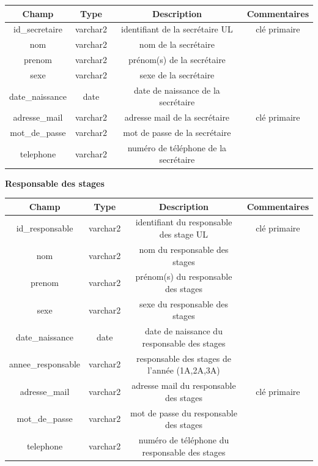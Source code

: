 \documentclass{scrreprt}
\begin{document}
\begin{center}
\begin{tabular}{|c|c|c|c|}
  \hline
  \textbf {Champ} & \textbf {Type} & \textbf {Description} & \textbf {Commentaires} \\
  \hline
  id_secretaire & varchar2 & identifiant de la secrétaire UL & clé primaire\\
  \hline
  nom & varchar2 & nom de la secrétaire & \\
  \hline
  prenom & varchar2 & prénom(s) de la secrétaire &  \\
  \hline
  sexe & varchar2 & sexe de la secrétaire &  \\
  \hline
  date_naissance & date & date de naissance de la secrétaire &  \\
  \hline
  adresse_mail & varchar2 & adresse mail de la secrétaire & clé primaire  \\
  \hline
  mot_de_passe & varchar2 & mot de passe de la secrétaire &  \\
  \hline
  telephone & varchar2 & numéro de téléphone de la secrétaire &  \\
  \hline
\end{tabular}

\vspace {1cm}
\textbf 
{Responsable des stages}
\vspace {0,5cm}

\begin{tabular}{|c|c|c|c|}
  \hline
  \textbf {Champ} & \textbf {Type} & \textbf {Description} & \textbf {Commentaires} \\
  \hline
  id_responsable & varchar2 & identifiant du responsable des stage UL & clé primaire\\
  \hline
  nom & varchar2 & nom du responsable des stages & \\
  \hline
  prenom & varchar2 & prénom(s) du responsable des stages &  \\
  \hline
  sexe & varchar2 & sexe du responsable des stages &  \\
  \hline
  date_naissance & date & date de naissance du responsable des stages &  \\
  \hline
  annee_responsable & varchar2 & responsable des stages de l'année (1A,2A,3A) &  \\
  \hline
  adresse_mail & varchar2 & adresse mail du responsable des stages & clé primaire  \\
  \hline
  mot_de_passe & varchar2 & mot de passe du responsable des stages &  \\
  \hline
  telephone & varchar2 & numéro de téléphone du responsable des stages &  \\
  \hline
\end{tabular}


\end{center}
\end{document}
